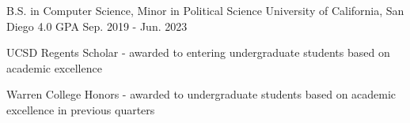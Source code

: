 

\begin{cventries}

    \cventry
    {B.S. in Computer Science, Minor in Political Science} %
    {University of California, San Diego} %
    {4.0 GPA} %
    {Sep. 2019 - Jun. 2023} %
    {
      \begin{cvitems} %
        \item {UCSD Regents Scholar - awarded to entering undergraduate students based on academic excellence}
        \item {Warren College Honors - awarded to undergraduate students based on academic excellence in previous quarters}
      \end{cvitems}
    }

\end{cventries}
